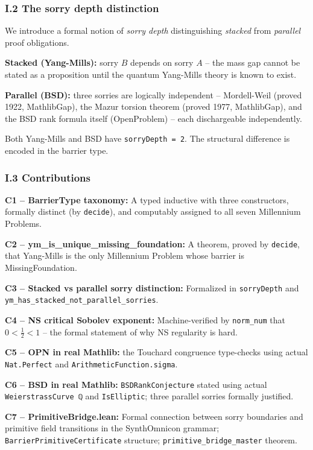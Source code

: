 \documentclass[12pt,a4paper]{article}
\begin{document}
\subsubsection{I.2 The sorry depth distinction}

We introduce a formal notion of \emph{sorry depth} distinguishing \emph{stacked} from \emph{parallel} proof obligations.

\textbf{Stacked (Yang-Mills):} sorry $B$ depends on sorry $A$  --  the mass gap cannot be stated as a proposition until the quantum Yang-Mills theory is known to exist.

\textbf{Parallel (BSD):} three sorries are logically independent  --  Mordell-Weil (proved 1922, MathlibGap), the Mazur torsion theorem (proved 1977, MathlibGap), and the BSD rank formula itself (OpenProblem)  --  each dischargeable independently.

Both Yang-Mills and BSD have \texttt{sorryDepth = 2}. The structural difference is encoded in the barrier type.

\subsubsection{I.3 Contributions}

\textbf{C1  --  BarrierType taxonomy:} A typed inductive with three constructors, formally distinct (by \texttt{decide}), and computably assigned to all seven Millennium Problems.

\textbf{C2  --  ym\_is\_unique\_missing\_foundation:} A theorem, proved by \texttt{decide}, that Yang-Mills is the only Millennium Problem whose barrier is MissingFoundation.

\textbf{C3  --  Stacked vs parallel sorry distinction:} Formalized in \texttt{sorryDepth} and \texttt{ym\_has\_stacked\_not\_parallel\_sorries}.

\textbf{C4  --  NS critical Sobolev exponent:} Machine-verified by \texttt{norm\_num} that $0 < \frac{1}{2} < 1$  --  the formal statement of why NS regularity is hard.

\textbf{C5  --  OPN in real Mathlib:} the Touchard congruence type-checks using actual \texttt{Nat.Perfect} and \texttt{ArithmeticFunction.sigma}.

\textbf{C6  --  BSD in real Mathlib:} \texttt{BSDRankConjecture} stated using actual \texttt{WeierstrassCurve ℚ} and \texttt{IsElliptic}; three parallel sorries formally justified.

\textbf{C7  --  PrimitiveBridge.lean:} Formal connection between sorry boundaries and primitive field transitions in the SynthOmnicon grammar; \texttt{BarrierPrimitiveCertificate} structure; \texttt{primitive\_bridge\_master} theorem.
\end{document}
